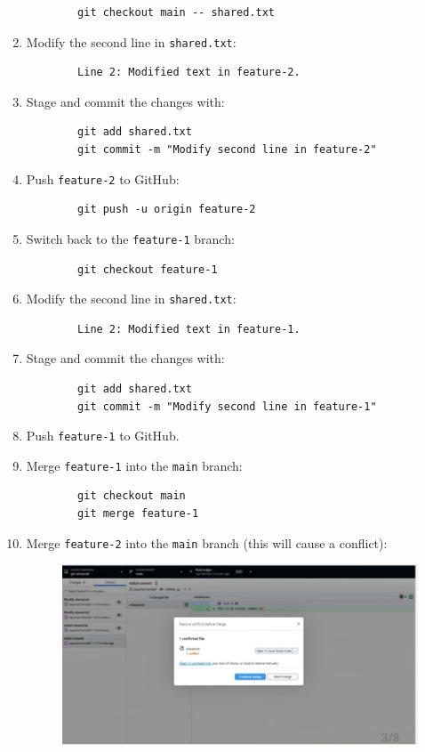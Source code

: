 \documentclass[a4paper,12pt]{article}
\begin{document}
\begin{enumerate}
\begin{verbatim}
        git checkout main -- shared.txt
        \end{verbatim}
    \item Modify the second line in \texttt{shared.txt}:
        \begin{verbatim}
        Line 2: Modified text in feature-2.
        \end{verbatim}
    \item Stage and commit the changes with:
        \begin{verbatim}
        git add shared.txt
        git commit -m "Modify second line in feature-2"
        \end{verbatim}
    \item Push \texttt{feature-2} to GitHub:
        \begin{verbatim}
        git push -u origin feature-2
        \end{verbatim}
    \item Switch back to the \texttt{feature-1} branch:
        \begin{verbatim}
        git checkout feature-1
        \end{verbatim}
    \item Modify the second line in \texttt{shared.txt}:
        \begin{verbatim}
        Line 2: Modified text in feature-1.
        \end{verbatim}
    \item Stage and commit the changes with:
        \begin{verbatim}
        git add shared.txt
        git commit -m "Modify second line in feature-1"
        \end{verbatim}
    \item Push \texttt{feature-1} to GitHub.
    \item Merge \texttt{feature-1} into the \texttt{main} branch:
        \begin{verbatim}
        git checkout main
        git merge feature-1
        \end{verbatim}
    \item Merge \texttt{feature-2} into the \texttt{main} branch (this will cause a conflict):
    \vspace{1 cm}
\begin{figure}[h!]
   \centering
    \includegraphics[width=0.5\linewidth]{conflict.jpg}

\end{figure}
\end{enumerate}
\end{document}
